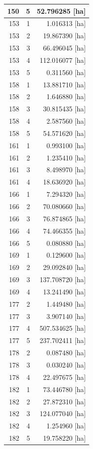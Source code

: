 \documentclass[11pt,]{book}
\begin{document}
\begin{table}
\begin{tabular}[t]{r|r|r}
\hline
150 & 5 & 52.796285 [ha]\\
\hline
153 & 1 & 1.016313 [ha]\\
\hline
153 & 2 & 19.867390 [ha]\\
\hline
153 & 3 & 66.496045 [ha]\\
\hline
153 & 4 & 112.016077 [ha]\\
\hline
153 & 5 & 0.311560 [ha]\\
\hline
158 & 1 & 13.881710 [ha]\\
\hline
158 & 2 & 1.646880 [ha]\\
\hline
158 & 3 & 30.815435 [ha]\\
\hline
158 & 4 & 2.587560 [ha]\\
\hline
158 & 5 & 54.571620 [ha]\\
\hline
161 & 1 & 0.993100 [ha]\\
\hline
161 & 2 & 1.235410 [ha]\\
\hline
161 & 3 & 8.498970 [ha]\\
\hline
161 & 4 & 18.636920 [ha]\\
\hline
166 & 1 & 7.294320 [ha]\\
\hline
166 & 2 & 70.080660 [ha]\\
\hline
166 & 3 & 76.874865 [ha]\\
\hline
166 & 4 & 74.466355 [ha]\\
\hline
166 & 5 & 0.080880 [ha]\\
\hline
169 & 1 & 0.129600 [ha]\\
\hline
169 & 2 & 29.092840 [ha]\\
\hline
169 & 3 & 137.708720 [ha]\\
\hline
169 & 4 & 13.241490 [ha]\\
\hline
177 & 2 & 1.449480 [ha]\\
\hline
177 & 3 & 3.907140 [ha]\\
\hline
177 & 4 & 507.534625 [ha]\\
\hline
177 & 5 & 237.702411 [ha]\\
\hline
178 & 2 & 0.087480 [ha]\\
\hline
178 & 3 & 0.030240 [ha]\\
\hline
178 & 4 & 22.497675 [ha]\\
\hline
182 & 1 & 73.446780 [ha]\\
\hline
182 & 2 & 27.872310 [ha]\\
\hline
182 & 3 & 124.077040 [ha]\\
\hline
182 & 4 & 1.254960 [ha]\\
\hline
182 & 5 & 19.758220 [ha]\\

\end{tabular}
\end{table}
\end{document}
